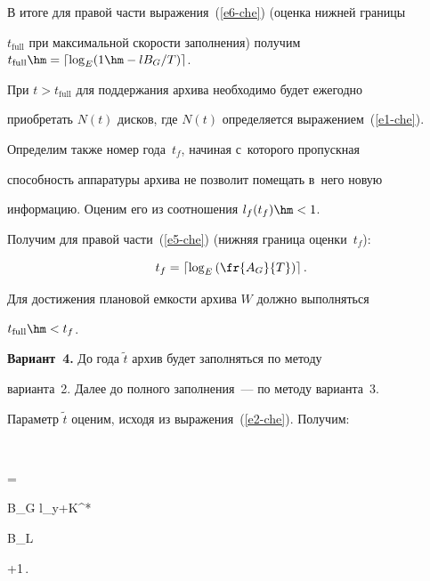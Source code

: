   


  \pagebreak


  


  В итоге для правой части выражения~(\ref{e6-che}) (оценка нижней границы 


$t_{\mathrm{full}}$ при максимальной скорости заполнения) получим $t_{\mathrm{full}} \hm= \lceil 


\log_E(1\hm- lB_G/T)\rceil$.


  


  При $t>t_{\mathrm{full}}$ для поддержания архива необходимо будет ежегодно 


приобретать $N(t)$ дисков, где $N(t)$ определяется выражением~(\ref{e1-che}).


  


  Определим также номер года~$t_f$, начиная с~которого пропускная 


способность аппаратуры архива не позволит помещать в~него новую 


информацию. Оценим его из соотношения $l_f(t_f)\hm<1$.


  


  Получим для правой части~(\ref{e5-che}) (нижняя граница оценки~$t_f$): 


$$


t_f= \left\lceil \log_E \left(\fr{A_G}{T}\right)\right\rceil.


$$


  


  Для достижения плановой емкости архива $W$ должно выполняться 


$t_{\mathrm{full}}\hm< t_f$.


  


  \noindent


  \textbf{Вариант~4.} До года $\tilde{t}$ архив будет заполняться по методу 


варианта~2. Далее до полного заполнения~--- по методу варианта~3.


  


  Параметр $\tilde{t}$ оценим, исходя из выражения~(\ref{e2-che}). Получим:


   


   $$


   =  \left\lfloor {} {B_G l_y+K^* 


B_L}\right\rfloor +1\,.


